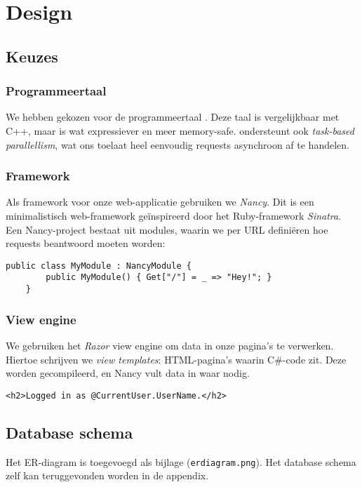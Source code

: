 \documentclass[12pt,parskip=full]{article}
\begin{document}
\section{Design}

\subsection{Keuzes}
\subsubsection{Programmeertaal}
We hebben gekozen voor de programmeertaal \CS{}. Deze taal is vergelijkbaar met C++, maar is wat expressiever en meer memory-safe. \CS{} ondersteunt ook \textit{task-based parallellism}, wat ons toelaat heel eenvoudig requests asynchroon af te handelen.

\subsubsection{Framework}
Als framework voor onze web-applicatie gebruiken we \textit{Nancy}. Dit is een
minimalistisch web-framework ge\"inspireerd door het Ruby-framework
\textit{Sinatra}. Een Nancy-project bestaat uit modules, waarin we per URL
defini\"eren hoe requests beantwoord moeten worden:

\begin{lstlisting}[caption=Een \textit{hello world}-applicatie in Nancy]
    public class MyModule : NancyModule {
        public MyModule() { Get["/"] = _ => "Hey!"; }
    }
\end{lstlisting}

\subsubsection{View engine}
We gebruiken het \textit{Razor} view engine om data in onze pagina's te
verwerken. Hiertoe schrijven we \textit{view templates}: HTML-pagina's waarin
C\#-code zit. Deze worden gecompileerd, en Nancy vult data in waar nodig.

\lstset{language=HTML}
\begin{lstlisting}[caption=Een simpel voorbeeld van een Razor view, label=razor]
    <h2>Logged in as @CurrentUser.UserName.</h2>
\end{lstlisting}

\subsection{Database schema}
Het ER-diagram is toegevoegd als bijlage (\texttt{erdiagram.png}). Het database schema zelf kan teruggevonden worden in de appendix.
\end{document}
